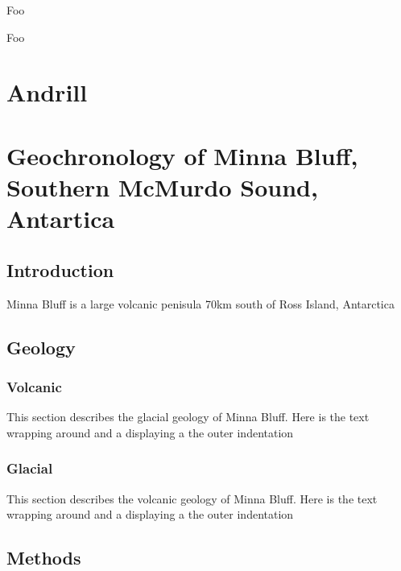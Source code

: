 \documentclass[12pt]{report}
\begin{document}
\begin{acknowledgments}
{Foo}

\end{acknowledgments}
\tableofcontents
%
%
\listoftables
\listoffigures
\signaturepage
\begin{preface}
{Foo}
\end{preface}

\chapter{Andrill}
\chapter{Geochronology of Minna Bluff, Southern McMurdo Sound, Antartica}
\section{Introduction}
Minna Bluff is a large volcanic penisula 70km south of Ross Island, Antarctica
\section{Geology}
\subsection{Volcanic}
This section describes the glacial geology of Minna Bluff. Here is the text
wrapping around and a displaying a the outer indentation
\subsection{Glacial}
This section describes the volcanic geology of Minna Bluff. Here is the text
wrapping around and a displaying a the outer indentation
\section{Methods}
\end{document}
